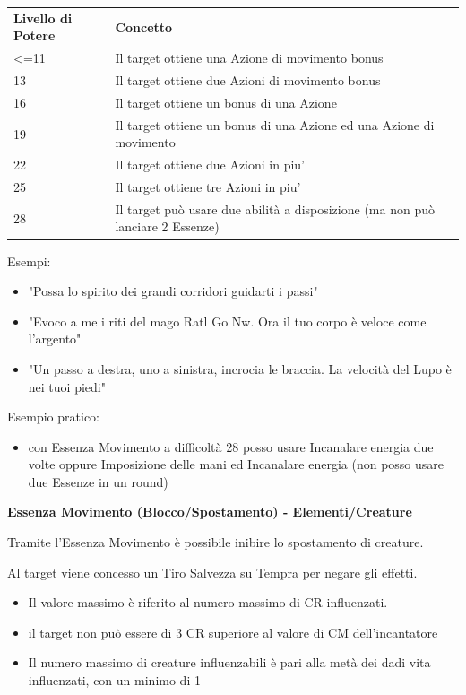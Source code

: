 \documentclass[a4paper,11pt,twoside,openany]{book}
\begin{document}
\bigskip

\begin{tabularx}{0.95\textwidth}{lX}
	\toprule
	\textbf{Livello di Potere} & \textbf{Concetto}\\
	\textless=11         & Il target ottiene una Azione di movimento bonus\\
	13       & Il target ottiene due Azioni di movimento bonus\\
	16       & Il target ottiene un bonus di una Azione\\
	19       & Il target ottiene un bonus di una Azione ed una Azione di movimento\\
	22       & Il target ottiene due Azioni in piu'\\
	25       & Il target ottiene tre Azioni in piu'\\
	28       & Il target può usare due abilità a disposizione (ma non può lanciare 2 Essenze)\\
\end{tabularx}

\bigskip

Esempi:
\begin{itemize}
	\item
	      "Possa lo spirito dei grandi corridori guidarti i passi"
	\item
	      "Evoco a me i riti del mago Ratl Go Nw. Ora il tuo corpo è veloce come l'argento"
	\item
	      "Un passo a destra, uno a sinistra, incrocia le braccia. La velocità del Lupo è nei tuoi piedi"
\end{itemize}
Esempio pratico:
\begin{itemize}
	\item
	      con Essenza Movimento a difficoltà 28 posso usare Incanalare energia due volte oppure Imposizione delle mani ed Incanalare energia (non posso usare due Essenze in un round)
\end{itemize}

\bigskip

\textbf{Essenza Movimento (Blocco/Spostamento) - Elementi/Creature}

Tramite l'Essenza Movimento è possibile inibire lo spostamento di creature.

Al target viene concesso un Tiro Salvezza su Tempra per negare gli effetti.
\begin{itemize}
	\item
	      Il valore massimo è riferito al numero massimo di CR influenzati.
	\item
	      il target non può essere di 3 CR superiore al valore di CM dell'incantatore
	\item
	      Il numero massimo di creature influenzabili è pari alla metà dei dadi vita influenzati, con un minimo di 1
\end{itemize}
\end{document}
